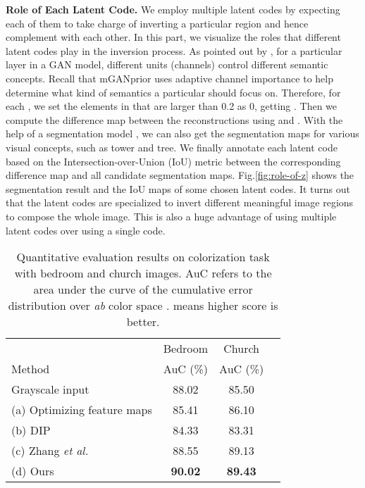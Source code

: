 \documentclass[10pt,twocolumn,letterpaper]{article}
\begin{document}
\vspace{2pt}\noindent\textbf{Role of Each Latent Code.}
We employ multiple latent codes by expecting each of them to take charge of inverting a particular region and hence complement with each other.
In this part, we visualize the roles that different latent codes play in the inversion process.
As pointed out by \cite{gandissection}, for a particular layer in a GAN model, different units (channels) control different semantic concepts.
Recall that mGANprior uses adaptive channel importance to help determine what kind of semantics a particular  should focus on.
Therefore, for each , we set the elements in  that are larger than 0.2 as 0, getting .
Then we compute the difference map between the reconstructions using  and .
With the help of a segmentation model \cite{zhou2017scene}, we can also get the segmentation maps for various visual concepts, such as tower and tree.
We finally annotate each latent code based on the Intersection-over-Union (IoU) metric between the corresponding difference map and all candidate segmentation maps.
Fig.\ref{fig:role-of-z} shows the segmentation result and the IoU maps of some chosen latent codes.
It turns out that the latent codes are specialized to invert different meaningful image regions to compose the whole image.
This is also a huge advantage of using multiple latent codes over using a single code.


\setlength{\tabcolsep}{10pt}
\begin{table}[t]
  \centering
  \footnotesize
  \captionsetup{font=small}
  \caption{
    Quantitative evaluation results on colorization task with bedroom and church images.
AuC refers to the area under the curve of the cumulative error distribution over \emph{ab} color space \cite{zhang2016colorful}.
 means higher score is better.
  }
  \label{tab:colorization}
  \vspace{-10pt}
  \begin{tabular}{lccc}
    \hline
                                                       & Bedroom            & Church \\
    Method                                             & AuC (\%) & AuC (\%) \\
    \hline
    Grayscale input                                    & 88.02              & 85.50 \\
(a) Optimizing feature maps \cite{bau2019semantic} & 85.41              & 86.10 \\
    (b) DIP \cite{ulyanov2018deep}                     & 84.33              & 83.31 \\
    (c) Zhang \emph{et al.} \cite{zhang2016colorful}   & 88.55              & 89.13 \\
    (d) Ours                                           & \bf 90.02          & \bf 89.43 \\
    \hline
  \end{tabular}
  \vspace{-10pt}
\end{table}
\end{document}
